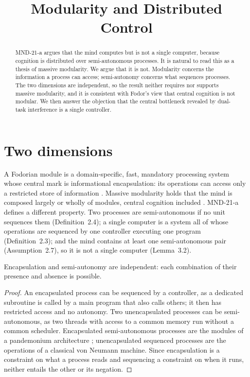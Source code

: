 \documentclass{situationist-preprint}
\title{Modularity and Distributed Control}
\begin{document}
\maketitle

\begin{abstract}
MND-21-a argues that the mind computes but is not a single computer, because cognition is distributed over semi-autonomous processes. It is natural to read this as a thesis of massive modularity. We argue that it is not. Modularity concerns the information a process can access; semi-autonomy concerns what sequences processes. The two dimensions are independent, so the result neither requires nor supports massive modularity, and it is consistent with Fodor's view that central cognition is not modular. We then answer the objection that the central bottleneck revealed by dual-task interference is a single controller.
\end{abstract}

\section{Two dimensions}

A Fodorian module is a domain-specific, fast, mandatory processing system whose central mark is informational encapsulation: its operations can access only a restricted store of information \citep{Fodor1983}. Massive modularity holds that the mind is composed largely or wholly of modules, central cognition included \citep{Carruthers2006}. MND-21-a defines a different property. Two processes are semi-autonomous if no unit sequences them (Definition~2.4); a single computer is a system all of whose operations are sequenced by one controller executing one program (Definition~2.3); and the mind contains at least one semi-autonomous pair (Assumption~2.7), so it is not a single computer (Lemma~3.2).

\begin{proposition}\label{p:indep}
Encapsulation and semi-autonomy are independent: each combination of their presence and absence is possible.
\end{proposition}

\begin{proof}
An encapsulated process can be sequenced by a controller, as a dedicated subroutine is called by a main program that also calls others; it then has restricted access and no autonomy. Two unencapsulated processes can be semi-autonomous, as two threads with access to a common memory run without a common scheduler. Encapsulated semi-autonomous processes are the modules of a pandemonium architecture \citep{Selfridge1959}; unencapsulated sequenced processes are the operations of a classical von Neumann machine. Since encapsulation is a constraint on what a process reads and sequencing a constraint on when it runs, neither entails the other or its negation.
\end{proof}
\end{document}
